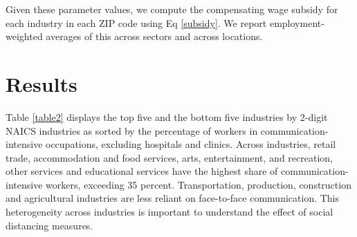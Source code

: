 Given these parameter values, we compute the compensating wage subsidy for each industry in each ZIP code using Eq \ref{subsidy}. We report employment-weighted averages of this across sectors and across locations.

\section*{Results}
Table \ref{table2} displays the top five and the bottom five industries by 2-digit NAICS industries as sorted by the percentage of workers in communication-intensive occupations, excluding hospitals and clinics. Across industries, retail trade, accommodation and food services, arts, entertainment, and recreation, other services and educational services have the highest share of communication-intensive workers, exceeding 35 percent. Transportation, production, construction and agricultural industries are less reliant on face-to-face communication. This heterogeneity across industries is important to understand the effect of social distancing measures.

